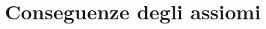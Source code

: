 \documentclass[FisicaTeorica.tex]{subfiles}
\begin{document}
\chapter{Conseguenze degli assiomi}



\end{document}
